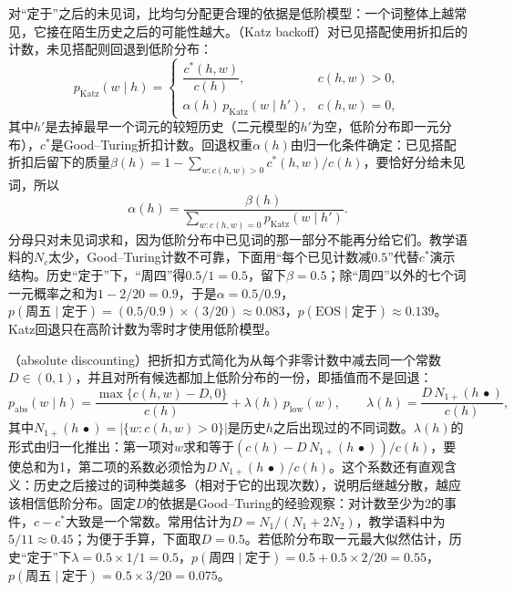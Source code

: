 对“定于”之后的未见词，比均匀分配更合理的依据是低阶模型：一个词整体上越常见，它接在陌生历史之后的可能性越大。（Katz backoff）对已见搭配使用折扣后的计数，未见搭配则回退到低阶分布：
\begin{equation}
  p_{\mathrm{Katz}}(w\mid h)=
  \begin{cases}
    \dfrac{c^{*}(h,w)}{c(h)}, & c(h,w)>0,\\[2ex]
    \alpha(h)\,p_{\mathrm{Katz}}(w\mid h'), & c(h,w)=0,
  \end{cases}
  \label{eq:nlp-classical-katz}
\end{equation}
其中$h'$是去掉最早一个词元的较短历史（二元模型的$h'$为空，低阶分布即一元分布），$c^*$是Good--Turing折扣计数。回退权重$\alpha(h)$由归一化条件确定：已见搭配折扣后留下的质量$\beta(h)=1-\sum_{w:c(h,w)>0}c^*(h,w)/c(h)$，要恰好分给未见词，所以
\[
  \alpha(h)=\frac{\beta(h)}{\sum_{w:c(h,w)=0}p_{\mathrm{Katz}}(w\mid h')}.
\]
分母只对未见词求和，因为低阶分布中已见词的那一部分不能再分给它们。教学语料的$N_c$太少，Good--Turing计数不可靠，下面用“每个已见计数减$0.5$”代替$c^*$演示结构。历史“定于”下，“周四”得$0.5/1=0.5$，留下$\beta=0.5$；除“周四”以外的七个词一元概率之和为$1-2/20=0.9$，于是$\alpha=0.5/0.9$，$p(\text{周五}\mid\text{定于})=(0.5/0.9)\times(3/20)\approx0.083$，$p(\mathrm{EOS}\mid\text{定于})\approx0.139$。Katz回退只在高阶计数为零时才使用低阶模型。

（absolute discounting）把折扣方式简化为从每个非零计数中减去同一个常数$D\in(0,1)$，并且对所有候选都加上低阶分布的一份，即插值而不是回退：
\begin{equation}
  p_{\mathrm{abs}}(w\mid h)=\frac{\max\{c(h,w)-D,0\}}{c(h)}+\lambda(h)\,p_{\mathrm{low}}(w),\qquad
  \lambda(h)=\frac{D\,N_{1+}(h\,\bullet)}{c(h)},
  \label{eq:nlp-classical-absolute}
\end{equation}
其中$N_{1+}(h\,\bullet)=|\{w:c(h,w)>0\}|$是历史$h$之后出现过的不同词数。$\lambda(h)$的形式由归一化推出：第一项对$w$求和等于$(c(h)-D\,N_{1+}(h\,\bullet))/c(h)$，要使总和为1，第二项的系数必须恰为$D\,N_{1+}(h\,\bullet)/c(h)$。这个系数还有直观含义：历史之后接过的词种类越多（相对于它的出现次数），说明后继越分散，越应该相信低阶分布。固定$D$的依据是Good--Turing的经验观察：对计数至少为2的事件，$c-c^*$大致是一个常数。常用估计为$D=N_1/(N_1+2N_2)$，教学语料中为$5/11\approx0.45$；为便于手算，下面取$D=0.5$。若低阶分布取一元最大似然估计，历史“定于”下$\lambda=0.5\times1/1=0.5$，$p(\text{周四}\mid\text{定于})=0.5+0.5\times2/20=0.55$，$p(\text{周五}\mid\text{定于})=0.5\times3/20=0.075$。

